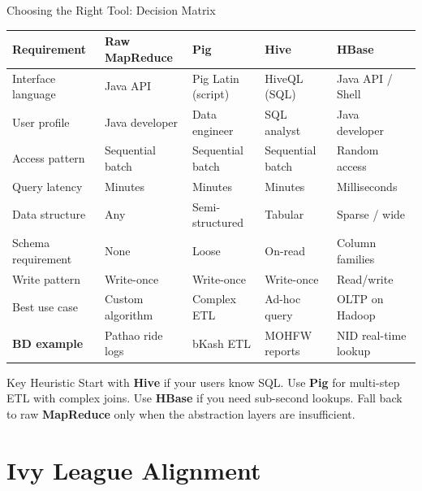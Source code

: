 \documentclass[aspectratio=169,10pt]{beamer}
\begin{document}
\begin{frame}{Choosing the Right Tool: Decision Matrix}
  \begin{center}
  \renewcommand{\arraystretch}{1.5}
  \begin{tabular}{p{2.8cm}p{2.3cm}p{2.3cm}p{2.3cm}p{2.3cm}}
    \toprule
    \textbf{Requirement} & \textbf{Raw MapReduce} & \textbf{Pig} & \textbf{Hive} & \textbf{HBase} \\
    \midrule
    Interface language  & Java API        & Pig Latin (script) & HiveQL (SQL) & Java API / Shell \\
    User profile        & Java developer  & Data engineer & SQL analyst  & Java developer \\
    Access pattern      & Sequential batch & Sequential batch & Sequential batch & Random access \\
    Query latency       & Minutes          & Minutes          & Minutes         & Milliseconds \\
    Data structure      & Any              & Semi-structured  & Tabular         & Sparse / wide   \\
    Schema requirement  & None             & Loose            & On-read         & Column families \\
    Write pattern       & Write-once       & Write-once       & Write-once      & Read/write      \\
    Best use case       & Custom algorithm & Complex ETL      & Ad-hoc query    & OLTP on Hadoop  \\
    \midrule
    \textbf{BD example} & Pathao ride logs & bKash ETL        & MOHFW reports   & NID real-time lookup \\
    \bottomrule
  \end{tabular}
  \end{center}
  \vspace{6pt}
  \begin{block}{Key Heuristic}
    Start with \textbf{Hive} if your users know SQL.  Use \textbf{Pig} for multi-step ETL with complex joins.  Use \textbf{HBase} if you need sub-second lookups.  Fall back to raw \textbf{MapReduce} only when the abstraction layers are insufficient.
  \end{block}
\end{frame}

\section{Ivy League Alignment}
\end{document}
